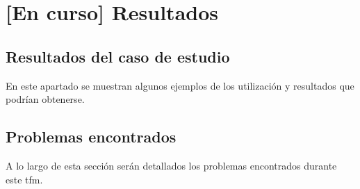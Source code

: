 \chapter{[En curso] Resultados}
\label{chapter:resultados}


\section{Resultados del caso de estudio}

    En este apartado se muestran algunos ejemplos de los utilización y resultados que podrían obtenerse.

\section{Problemas encontrados}

    A lo largo de esta sección serán detallados los problemas encontrados durante este \gls{tfm}.
    

